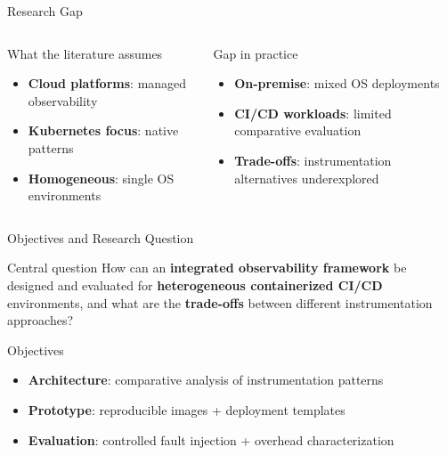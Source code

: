 \documentclass[aspectratio=169]{beamer}
\begin{document}
\begin{frame}{Research Gap}
\begin{columns}[T,onlytextwidth]
  \begin{block}{What the literature assumes}
  \begin{itemize}
    \item \textbf{Cloud platforms}: managed observability
    \item \textbf{Kubernetes focus}: native patterns
    \item \textbf{Homogeneous}: single OS environments
  \end{itemize}
  \end{block}

  \begin{block}{Gap in practice}
  \begin{itemize}
    \item \textbf{On-premise}: mixed OS deployments
    \item \textbf{CI/CD workloads}: limited comparative evaluation
    \item \textbf{Trade-offs}: instrumentation alternatives underexplored
  \end{itemize}
  \end{block}
\end{columns}
\end{frame}

\begin{frame}{Objectives and Research Question}
\begin{block}{Central question}
  How can an \textbf{integrated observability framework} be designed and evaluated for
  \textbf{heterogeneous containerized CI/CD} environments, and what are the \textbf{trade-offs} between different instrumentation approaches?
\end{block}

\begin{block}{Objectives}
  \begin{itemize}
    \item \textbf{Architecture}: comparative analysis of instrumentation patterns
    \item \textbf{Prototype}: reproducible images + deployment templates
    \item \textbf{Evaluation}: controlled fault injection + overhead characterization
  \end{itemize}
\end{block}
\end{frame}
\end{document}
